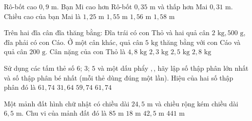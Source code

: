 \begin{ex} %
Rô-bốt cao $0{,}9\text{ m}$. Bạn Mi cao hơn Rô-bốt $0{,}35\text{ m}$ và thấp hơn Mai $0{,}31\text{ m}$. Chiều cao của bạn Mai là
\choice
{$1{,}25\text{ m}$}
{$1{,}55\text{ m}$}
{\True $1{,}56\text{ m}$}
{$1{,}58\text{ m}$}
\end{ex}

\begin{ex} %
Trên hai đĩa cân đĩa thăng bằng: Đĩa trái có con Thỏ và hai quả cân $2\text{ kg}, 500\text{ g}$, đĩa phải có con Cáo. Ở một cân khác, quả cân $5\text{ kg}$ thăng bằng với con Cáo và quả cân $200\text{ g}$. Cân nặng của con Thỏ là
\choice
{$4{,}8\text{ kg}$}
{\True $2{,}3\text{ kg}$}
{$2{,}5\text{ kg}$}
{$2{,}8\text{ kg}$}
\end{ex}

\begin{ex} %
Sử dụng các tấm thẻ số $6$; $3$; $5$ và một dấu phẩy $,$, hãy lập số thập phân lớn nhất và số thập phân bé nhất (mỗi thẻ dùng đúng một lần). Hiệu của hai số thập phân đó là
\choice
{$61{,}74$}
{$31{,}64$}
{$59{,}74$}
{\True $61{,}74$}
\end{ex}

\begin{ex} %
Một mảnh đất hình chữ nhật có chiều dài $24{,}5\text{ m}$ và chiều rộng kém chiều dài $6{,}5\text{ m}$. Chu vi của mảnh đất đó là
\choice
{\True $85\text{ m}$}
{$18\text{ m}$}
{$42{,}5\text{ m}$}
{$441\text{ m}$}
\end{ex}

